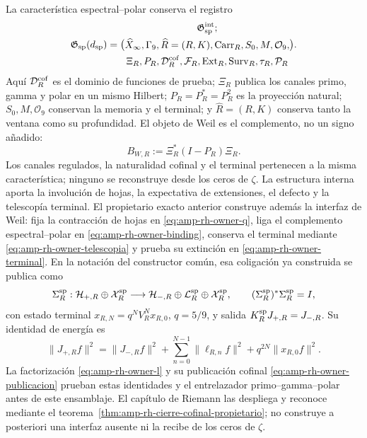 La característica espectral--polar conserva el registro
\begin{equation}\label{eq:pdf2-g-sp-explicito}
 \mathfrak G_{\rm sp}(d_{\rm sp})=
 \bigl(
 \begin{gathered}
  \mathfrak G_{\rm sp}^{\rm int};\\
  \widehat X_\infty,\Gamma_9,\widehat R=(R,K),
  \operatorname{Carr}_R,S_0,M,\mathcal O_9,\\
  \Xi_R,P_R,\mathcal D_R^{\rm cof},
  \mathcal F_R,\operatorname{Ext}_R,\operatorname{Surv}_R,
  \tau_R,\mathcal P_R
 \end{gathered}
 \bigr).
\end{equation}
Aquí $\mathcal D_R^{\rm cof}$ es el dominio de funciones de prueba; $\Xi_R$ publica
los canales primo, gamma y polar en un mismo Hilbert; $P_R=P_R^*=P_R^2$ es la
proyección natural; $S_0,M,\mathcal O_9$ conservan la memoria y el terminal; y
$\widehat R=(R,K)$ conserva tanto la ventana como su profundidad. El objeto de Weil
es el complemento, no un signo añadido:
\begin{equation}\label{eq:pdf2-g-sp-complemento}
 B_{W,R}:=\Xi_R^*(I-P_R)\Xi_R.
\end{equation}
Los canales regulados, la naturalidad cofinal y el terminal pertenecen a la misma
característica; ninguno se reconstruye desde los ceros de $\zeta$. La estructura
interna aporta la involución de hojas, la expectativa de extensiones, el defecto y
la telescopía terminal. El propietario exacto anterior construye además la
interfaz de Weil: fija la contracción de hojas en
\eqref{eq:amp-rh-owner-q}, liga el complemento espectral--polar en
\eqref{eq:amp-rh-owner-binding}, conserva el terminal mediante
\eqref{eq:amp-rh-owner-telescopia} y prueba su extinción en
\eqref{eq:amp-rh-owner-terminal}. En la notación del constructor común, esa
coligación ya construida se publica como
\begin{equation}\label{eq:pdf2-g-sp-coligacion-dato}
 \Sigma_R^{\rm sp}:
 \mathcal H_{+,R}\oplus\mathcal X_R^{\rm sp}
 \longrightarrow
 \mathcal H_{-,R}\oplus\mathcal L_R^{\rm sp}
 \oplus\mathcal X_R^{\rm sp},
 \qquad
 (\Sigma_R^{\rm sp})^*\Sigma_R^{\rm sp}=I,
\end{equation}
con estado terminal $x_{R,N}=q^NV_R^Nx_{R,0}$, $q=5/9$, y salida
$K_R^{\rm sp}J_{+,R}=J_{-,R}$. Su identidad de energía es
\begin{equation}\label{eq:pdf2-g-sp-identidad-finita-dato}
 \|J_{+,R}f\|^2
 =\|J_{-,R}f\|^2+
   \sum_{n=0}^{N-1}\|\ell_{R,n}f\|^2+
   q^{2N}\|x_{R,0}f\|^2.
\end{equation}
La factorización \eqref{eq:amp-rh-owner-l} y su publicación cofinal
\eqref{eq:amp-rh-owner-publicacion} prueban estas identidades y el
entrelazador primo--gamma--polar antes de este ensamblaje. El capítulo de
Riemann las despliega y reconoce mediante el
teorema~\ref{thm:amp-rh-cierre-cofinal-propietario}; no construye a
posteriori una interfaz ausente ni la recibe de los ceros de $\zeta$.

